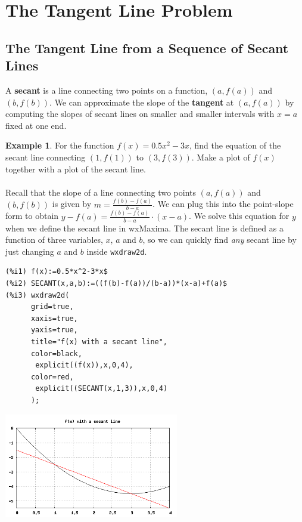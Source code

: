\documentclass[10.5pt,twoside]{report}
\theoremstyle{definition}
\newtheorem{exmp}{Example}[section]
\begin{document}
\pagebreak

\section{The Tangent Line Problem}\label{The Tangent Line Problem}

\subsection{The Tangent Line from a Sequence of Secant Lines}

A \textbf{secant} is a line connecting two points on a function, $(a,f(a))$ and $(b,f(b))$.  We can approximate the slope of the \textbf{tangent} at $(a,f(a))$ by computing the slopes of secant lines on smaller and smaller intervals with $x=a$ fixed at one end.\\


\begin{exmp}  For the function $f(x)=0.5x^2-3x$, find the equation of the secant line connecting $(1,f(1))$ to $(3,f(3))$.  Make a plot of $f(x)$ together with a plot of the secant line.\\
${}$\\

Recall that the slope of a line connecting two points $(a,f(a))$ and $(b,f(b))$ is given by $m=\frac{f(b)-f(a)}{b-a}$.  We can plug this into the point-slope form to obtain $y-f(a)=\frac{f(b)-f(a)}{b-a}\cdot(x-a)$.  We solve this equation for $y$ when we define the secant line in wxMaxima.  The secant line is defined as a function of three variables, $x$, $a$ and $b$, so we can quickly find \textit{any} secant line by just changing $a$ and $b$ inside \verb|wxdraw2d|.

\begin{verbatim}
(%i1) f(x):=0.5*x^2-3*x$
(%i2) SECANT(x,a,b):=((f(b)-f(a))/(b-a))*(x-a)+f(a)$
(%i3) wxdraw2d(
      grid=true,
      xaxis=true,
      yaxis=true,
      title="f(x) with a secant line",
      color=black,
       explicit((f(x)),x,0,4),
      color=red,
       explicit((SECANT(x,1,3)),x,0,4)
      );
\end{verbatim}


\includegraphics[width=3in]{example_4_1_1}


\end{exmp}
\end{document}
